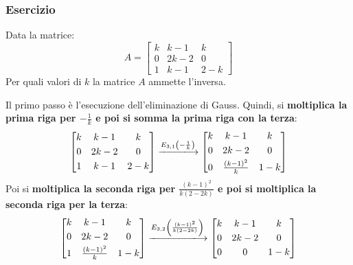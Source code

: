 \documentclass[a4paper]{article}
\makeatletter
\newenvironment{rowequmatbra}[1]{\left[\array{@{}#1@{}}}{\endarray\right]}
\makeatother
\begin{document}
	\subsubsection{Esercizio}
	
	Data la matrice:
	\begin{equation*}
		A = \begin{bmatrix}
			k &  k-1 &   k \\
			0 & 2k-2 &   0 \\
			1 &  k-1 & 2-k
		\end{bmatrix}
	\end{equation*}
	Per quali valori di $k$ la matrice $A$ ammette l'inversa.\newline
	
	\noindent
	Il \textcolor{Red3}{primo passo} è l'esecuzione dell'eliminazione di Gauss. Quindi, si \textbf{moltiplica la prima riga per $-\frac{1}{k}$ e poi si somma la prima riga con la terza}:
	\begin{equation*}
		\begin{rowequmatbra}{ccc}
			k &  k-1 &   k \\ [0.3em]
			0 & 2k-2 &   0 \\ [0.3em]
			1 &  k-1 & 2-k
		\end{rowequmatbra} \xlongrightarrow{E_{3,1}\left(-\frac{1}{k}\right)}
		\begin{rowequmatbra}{ccc}
			k &  k-1 &   k \\ [0.3em]
			0 & 2k-2 &   0 \\ [0.3em]
			0 &  \frac{\left(k-1\right)^{2}}{k} & 1-k
		\end{rowequmatbra}
	\end{equation*}
	Poi si \textbf{moltiplica la seconda riga per $\frac{\left(k-1\right)^{2}}{k\left(2-2k\right)}$ e poi si moltiplica la seconda riga per la terza}:
	\begin{equation*}
		\begin{rowequmatbra}{ccc}
			k &  k-1 &   k \\ [0.3em]
			0 & 2k-2 &   0 \\ [0.3em]
			1 &  \frac{\left(k-1\right)^{2}}{k} & 1-k
		\end{rowequmatbra} \xlongrightarrow{E_{3,2}\left(\frac{\left(k-1\right)^{2}}{k\left(2-2k\right)}\right)}
		\begin{rowequmatbra}{ccc}
			k &  k-1 &   k \\ [0.3em]
			0 & 2k-2 &   0 \\ [0.3em]
			0 &    0 & 1-k
		\end{rowequmatbra}
	\end{equation*}
\end{document}
